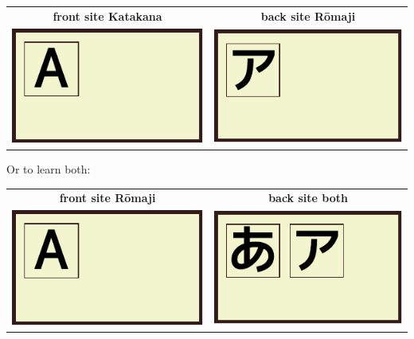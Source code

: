 \begin{center}
\begin{tabular}{cc}
\textbf{front site Katakana}&\textbf{back site Rōmaji}\\
\includegraphics[scale=1.5]{../share/i/fcar.pdf}%
&
\includegraphics[scale=1.5]{../share/i/fcak.pdf}%
\\
\end{tabular}
\end{center}

Or to learn both:

\begin{center}
\begin{tabular}{cc}
\textbf{front site Rōmaji}&\textbf{back site both}\\
\includegraphics[scale=1.5]{../share/i/fcar.pdf}%
&
\includegraphics[scale=1.5]{../share/i/fcahk.pdf}%
\\
\end{tabular}
\end{center}

